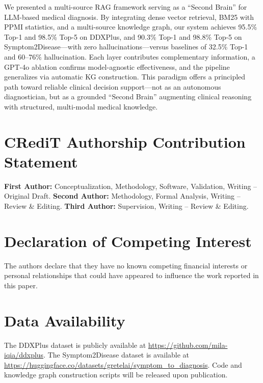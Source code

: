 \documentclass[preprint,12pt]{elsarticle}
\begin{document}
We presented a multi-source RAG framework serving as a ``Second Brain'' for LLM-based medical diagnosis. By integrating dense vector retrieval, BM25 with PPMI statistics, and a multi-source knowledge graph, our system achieves 95.5\% Top-1 and 98.5\% Top-5 on DDXPlus, and 90.3\% Top-1 and 98.8\% Top-5 on Symptom2Disease---with zero hallucinations---versus baselines of 32.5\% Top-1 and 60--76\% hallucination. Each layer contributes complementary information, a GPT-4o ablation confirms model-agnostic effectiveness, and the pipeline generalizes via automatic KG construction. This paradigm offers a principled path toward reliable clinical decision support---not as an autonomous diagnostician, but as a grounded ``Second Brain'' augmenting clinical reasoning with structured, multi-modal medical knowledge.

\section*{CRediT Authorship Contribution Statement}

\textbf{First Author:} Conceptualization, Methodology, Software, Validation, Writing -- Original Draft.
\textbf{Second Author:} Methodology, Formal Analysis, Writing -- Review \& Editing.
\textbf{Third Author:} Supervision, Writing -- Review \& Editing.

\section*{Declaration of Competing Interest}

The authors declare that they have no known competing financial interests or personal relationships that could have appeared to influence the work reported in this paper.

\section*{Data Availability}

The DDXPlus dataset is publicly available at \url{https://github.com/mila-iqia/ddxplus}. The Symptom2Disease dataset is available at \url{https://huggingface.co/datasets/gretelai/symptom_to_diagnosis}. Code and knowledge graph construction scripts will be released upon publication.


\end{document}
